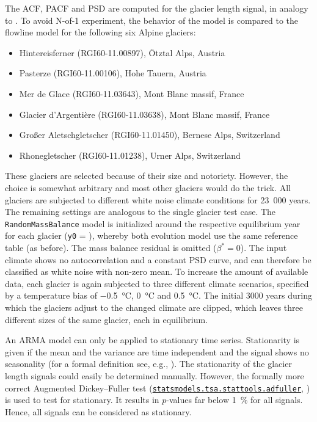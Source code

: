         The ACF, PACF and PSD are computed for the glacier length signal, in analogy to \citep{Roe2014}. To avoid N-of-1 experiment, the behavior of the \vas{} model is compared to the flowline model for the following six Alpine glaciers:
        \begin{itemize}
            \item Hintereisferner (RGI60-11.00897), Ötztal Alps, Austria
            \item Pasterze (RGI60-11.00106), Hohe Tauern, Austria
            \item Mer de Glace (RGI60-11.03643), Mont Blanc massif, France
            \item Glacier d'Argentière (RGI60-11.03638), Mont Blanc massif, France
            \item Großer Aletschgletscher (RGI60-11.01450), Bernese Alps, Switzerland
            \item Rhonegletscher (RGI60-11.01238), Urner Alps, Switzerland
        \end{itemize}
        These glaciers are selected because of their size and notoriety. However, the choice is somewhat arbitrary and most other glaciers would do the trick. All glaciers are subjected to different white noise climate conditions for 23\ 000 years. The remaining settings are analogous to the single glacier test case. The \lstinline`RandomMassBalance` model is initialized around the respective equilibrium year for each glacier (\lstinline`y0` = \tstar), whereby both evolution model use the same \tstar{} reference table (as before). The mass balance residual is omitted ($\beta^* = 0$). The input climate shows no autocorrelation and a constant PSD curve, and can therefore be classified as white noise with non-zero mean.
        To increase the amount of available data, each glacier is again subjected to three different climate scenarios, specified by a temperature bias of \SI{-0.5}{\celsius}, \SI{0}{\celsius} and \SI{+0.5}{\celsius}. The initial 3000 years during which the glaciers adjust to the changed climate are clipped, which leaves three different sizes of the same glacier, each in equilibrium.

        An ARMA model can only be applied to stationary time series. Stationarity is given if the mean and the variance are time independent and the signal shows no seasonality (for a formal definition see, e.g., \citet{BoxJenkins2015}). The stationarity of the glacier length signals could easily be determined manually. However, the formally more correct Augmented Dickey--Fuller test (\href{https://www.statsmodels.org/devel/generated/statsmodels.tsa.stattools.adfuller.html}{\lstinline`statsmodels.tsa.stattools.adfuller`}, \citet{Cheung1995-ADFuller}) is used to test for stationary. It results in $p$-values far below \SI{1}{\percent} for all signals. Hence, all signals can be considered as stationary.

